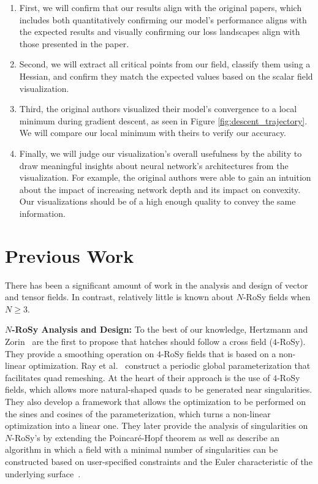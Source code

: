 \documentclass{acmsiggraph}               %
\begin{document}
\begin{enumerate}
	\item First, we will confirm that our results align with the original papers, which includes both quantitatively confirming our model’s performance aligns with the expected results and visually confirming our loss landscapes align with those presented in the paper. 
	\item Second, we will extract all critical points from our field, classify them using a Hessian, and confirm they match the expected values based on the scalar field visualization. 
	\item Third, the original authors visualized their model’s convergence to a local minimum during gradient descent, as seen in  Figure \ref{fig:descent_trajectory}. We will compare our local minimum with theirs to verify our accuracy.
	\item Finally, we will judge our visualization’s overall usefulness by the ability to draw meaningful insights about neural network’s architectures from the visualization. For example, the original authors were able to gain an intuition about the impact of increasing network depth and its impact on convexity. 
	Our visualizations should be of a high enough quality to convey the same information.
\end{enumerate}


\section{Previous Work}
\label{sec:previous_work}

There has been a significant amount of work in the analysis and
design of vector and tensor fields. In contrast, relatively little
is known about $N$-RoSy fields when $N \ge 3$.

	{\bf $N$-RoSy Analysis and Design:} To the best of our knowledge,
Hertzmann and Zorin~ are the first to
propose that hatches should follow a cross field ($4$-RoSy). They
provide a smoothing operation on $4$-RoSy fields that is based on a
non-linear optimization. Ray et al.~ construct a
periodic global parameterization that facilitates quad remeshing. At
the heart of their approach is the use of $4$-RoSy fields, which
allows more natural-shaped quads to be generated near singularities.
They also develop a framework that allows the optimization to be
performed on the sines and cosines of the parameterization, which
turns a non-linear optimization into a linear one. They later
provide the analysis of singularities on $N$-RoSy's by extending the
Poincar\'e-Hopf theorem as well as describe an algorithm in which a
field with a minimal number of singularities can be constructed
based on user-specified constraints and the Euler characteristic of
the underlying surface~\cite{ray:07}.
\end{document}
